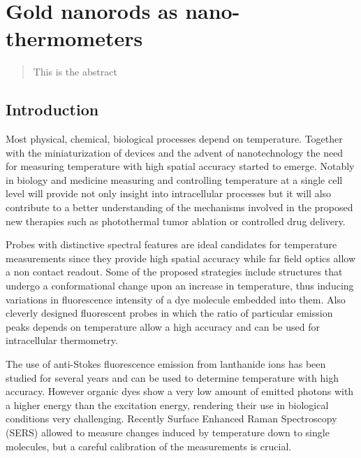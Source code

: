 \chapter{Gold nanorods as nano-thermometers}
\label{ch:AntiStokes}

\begin{abstract}
This is the abstract
\end{abstract}

\section{Introduction}
Most physical, chemical, biological processes depend on temperature. Together
with the miniaturization of devices and the advent of nanotechnology the need
for measuring temperature with high spatial accuracy started to emerge. Notably
in biology\cite{Yang2011a,Hrelescu2010} and medicine\cite{Li2013c}
measuring and controlling temperature at a single cell level will provide not only insight into
intracellular processes but it will also contribute to a better understanding of
the mechanisms involved in the proposed new therapies such as photothermal tumor
ablation\cite{Gobin2007} or controlled drug
delivery\cite{Huang2006,Huo2014}.

Probes with distinctive spectral features are ideal candidates for temperature
measurements since they provide high spatial accuracy while far field optics
allow a non contact readout. Some of the proposed strategies include structures
that undergo a conformational change upon an increase in
temperature\cite{Ebrahimi2014}, thus inducing variations in fluorescence
intensity of a dye molecule embedded into them. Also cleverly designed
fluorescent probes\cite{Vetrone2010} in which the ratio of particular emission
peaks depends on temperature allow a high accuracy and can be used for
intracellular thermometry.

The use of anti-Stokes fluorescence emission from lanthanide ions has been
studied for several years\cite{Auzel2004a} and can be used to determine
temperature with high accuracy. However organic dyes show a very low amount of
emitted photons with a higher energy than the excitation energy, rendering their
use in biological conditions very challenging. Recently Surface Enhanced Raman
Spectroscopy (SERS) allowed to measure changes induced by temperature down
to single molecules\cite{Pozzi2015}, but a careful calibration of the
measurements is crucial.

